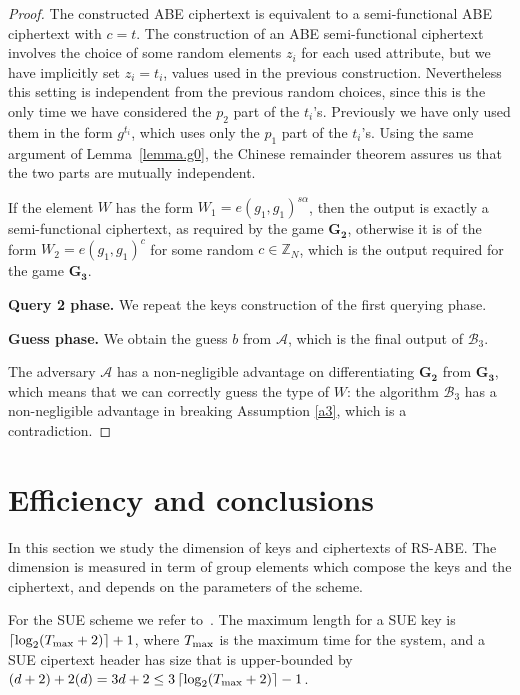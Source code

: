 \documentclass[a4paper,10pt]{article}
\newcommand{\Z}{\mathbb{Z}}
\newcommand{\game}[2]{$\mathbf{#1_{#2}}$}
\newcommand{\phase}[1]{\textbf{#1 phase.} \hspace{0pt}}
\begin{document}
\begin{proof}
	The constructed ABE ciphertext is equivalent to a semi-functional ABE ciphertext with $c=t$. The construction of an ABE semi-functional ciphertext involves the choice of some random elements $z_i$ for each used attribute, but we have implicitly set $z_i=t_i$, values used in the previous construction. Nevertheless this setting is independent from the previous random choices, since this is the only time we have considered the $p_2$ part of the $t_i$'s.
Previously we have only used them in the form $g^{t_i}$, which uses only the $p_1$ part of the $t_i$'s. Using the same argument of Lemma~\ref{lemma.g0}, the Chinese remainder theorem assures us that the two parts are mutually independent.
	
	If the element $W$ has the form $W_1=e(g_1,g_1)^{s\alpha}$, then the output is exactly a semi-functional ciphertext, as required by the game \game{G}{2}, otherwise it is of the form $W_2=e(g_1,g_1)^c$ for some random $c\in \Z_N$, which is the output required for the game \game{G}{3}.
	
	\phase{Query 2}
	We repeat the keys construction of the first querying phase.
	
	\phase{Guess}
	We obtain the guess $b$ from $\mathcal{A}$, which is the final output of $\mathscr{B}_3$.
	
	The adversary $\mathcal{A}$ has a non-negligible advantage on differentiating \game{G}{2} from \game{G}{3}, which means that we can correctly guess the type of $W$: the algorithm $\mathscr{B}_3$ has a non-negligible advantage in breaking Assumption \ref{a3}, which is a contradiction.
	\end{proof}
	


	\section{Efficiency and conclusions}
	\label{efficiency.sec}
	In this section we study the dimension of keys and ciphertexts of RS-ABE.
	The dimension is measured in term of group elements which compose the keys and the ciphertext, and depends on the parameters of the scheme.
	
	For the SUE scheme we refer to~\cite{lee2013RSABE}. The maximum length for a SUE key is $\left\lceil \log_2(T_\textnormal{max}+2) \right\rceil+1$, where $T_\textnormal{max}$ is the maximum time for the system, and a SUE cipertext header has size that is upper-bounded by $(d+2)+2(d)=3d+2\leq 3 \left\lceil \log_2(T_\textnormal{max}+2) \right\rceil -1$.
	
\end{document}
